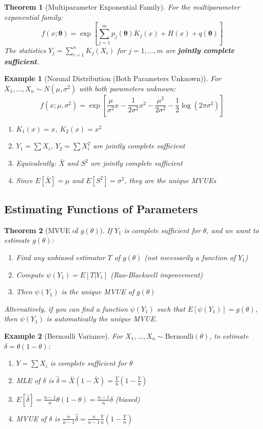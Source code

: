 \documentclass[12pt,a4paper]{amsart}
\newtheorem{theorem}{Theorem}[section]
\newtheorem{example}{Example}[section]
\theoremstyle{remark}
\begin{document}
\begin{theorem}[Multiparameter Exponential Family]
For the multiparameter exponential family:
$$f(x; \boldsymbol{\theta}) = \exp\left[\sum_{j=1}^m p_j(\boldsymbol{\theta}) K_j(x) + H(x) + q(\boldsymbol{\theta})\right]$$
The statistics $Y_j = \sum_{i=1}^n K_j(X_i)$ for $j = 1, \ldots, m$ are \textbf{jointly complete sufficient}.
\end{theorem}

\begin{example}[Normal Distribution (Both Parameters Unknown)]
For $X_1, \ldots, X_n \sim N(\mu, \sigma^2)$ with both parameters unknown:
$$f(x; \mu, \sigma^2) = \exp\left[\frac{\mu}{\sigma^2}x - \frac{1}{2\sigma^2}x^2 - \frac{\mu^2}{2\sigma^2} - \frac{1}{2}\log(2\pi\sigma^2)\right]$$
\begin{enumerate}
\item $K_1(x) = x$, $K_2(x) = x^2$
\item $Y_1 = \sum X_i$, $Y_2 = \sum X_i^2$ are jointly complete sufficient
\item Equivalently: $\bar{X}$ and $S^2$ are jointly complete sufficient
\item Since $E[\bar{X}] = \mu$ and $E[S^2] = \sigma^2$, they are the unique MVUEs
\end{enumerate}
\end{example}

\subsection{Estimating Functions of Parameters}

\begin{theorem}[MVUE of $g(\theta)$]
If $Y_1$ is complete sufficient for $\theta$, and we want to estimate $g(\theta)$:
\begin{enumerate}
\item Find any unbiased estimator $T$ of $g(\theta)$ (not necessarily a function of $Y_1$)
\item Compute $\psi(Y_1) = E[T | Y_1]$ (Rao-Blackwell improvement)
\item Then $\psi(Y_1)$ is the unique MVUE of $g(\theta)$
\end{enumerate}
Alternatively, if you can find a function $\psi(Y_1)$ such that $E[\psi(Y_1)] = g(\theta)$, then $\psi(Y_1)$ is automatically the unique MVUE.
\end{theorem}

\begin{example}[Bernoulli Variance]
For $X_1, \ldots, X_n \sim \text{Bernoulli}(\theta)$, to estimate $\delta = \theta(1-\theta)$:
\begin{enumerate}
\item $Y = \sum X_i$ is complete sufficient for $\theta$
\item MLE of $\delta$ is $\hat{\delta} = \bar{X}(1-\bar{X}) = \frac{Y}{n}(1-\frac{Y}{n})$
\item $E[\hat{\delta}] = \frac{n-1}{n}\theta(1-\theta) = \frac{n-1}{n}\delta$ (biased)
\item MVUE of $\delta$ is $\frac{n}{n-1}\hat{\delta} = \frac{n}{n-1}\frac{Y}{n}(1-\frac{Y}{n})$
\end{enumerate}
\end{example}
\end{document}
